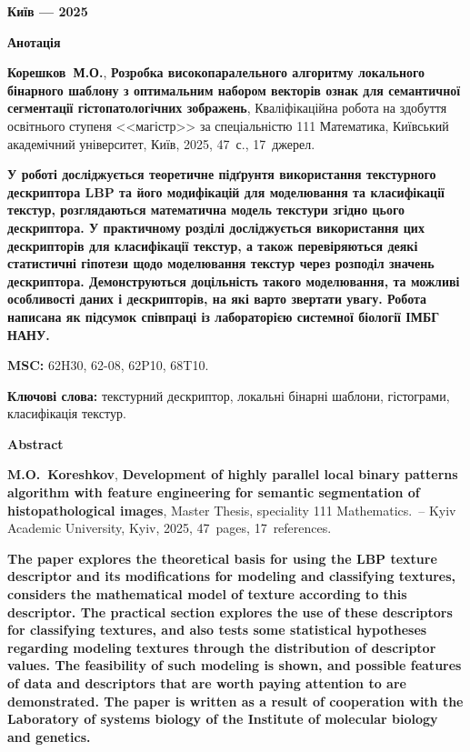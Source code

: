\documentclass{thesis}
\newcommand{\MyInitialName}{Корешков~М.О.}
\newcommand{\ThesisName}{Розробка високопаралельного алгоритму локального бінарного шаблону з оптимальним набором векторів ознак для семантичної сегментації гістопатологічних зображень}
\newcommand{\NumPages}{47}
\newcommand{\NumCitations}{17}
\newcommand{\MyReverseInitialNameEn}{M.O.~Koreshkov}
\newcommand{\ThesisNameEn}{Development of highly parallel local binary patterns algorithm with feature engineering for semantic segmentation of histopathological images}
\newcommand{\MSC}{62H30, 62-08, 62P10, 68T10.}
\newcommand{\1}{\mathbb 1}
\begin{document}
\vfill

\centerline{\bf Київ --- 2025}

\newpage

\begin{center}
\Large \bf Анотація
\end{center}

\noindent
\textbf{\MyInitialName}, \textbf{\ThesisName}, Кваліфікаційна робота на здобуття освітнього ступеня <<магістр>> за спеціальністю 111 Математика, Київський академічний університет, Київ, 2025, \NumPages~с., \NumCitations~джерел.

\bigskip


{\bf У роботі досліджується теоретичне підґрунтя використання текстурного дескриптора LBP та його модифікацій для моделювання та класифікації текстур, 
розглядаються математична модель текстури згідно цього дескриптора.
У практичному розділі досліджується використання цих дескрипторів для класифікації текстур, 
а також перевіряються деякі статистичні гіпотези щодо моделювання текстур через розподіл значень дескриптора.
Демонструються доцільність такого моделювання, та можливі особливості даних і дескрипторів, на які варто звертати увагу.
Робота написана як підсумок співпраці із лабораторією системної біології ІМБГ НАНУ.}

\bigskip

\noindent
{\bf MSC:} \MSC

\bigskip

\noindent
{\bf Ключові слова:} текстурний дескриптор, локальні бінарні шаблони, гістограми, класифікація текстур.
\bigskip

\newpage

\begin{center}
\Large \bf Abstract
\end{center}

\noindent
\textbf{\MyReverseInitialNameEn}, \textbf{\ThesisNameEn}, Master Thesis, speciality 111 Mathematics.~--
Kyiv Academic University, Kyiv, 2025, \NumPages~pages, \NumCitations~references.

\bigskip
{\bf The paper explores the theoretical basis for using the LBP texture descriptor and its modifications for modeling and classifying textures,
considers the mathematical model of texture according to this descriptor.
The practical section explores the use of these descriptors for classifying textures,
and also tests some statistical hypotheses regarding modeling textures through the distribution of descriptor values.
The feasibility of such modeling is shown, and possible features of data and descriptors that are worth paying attention to are demonstrated.
The paper is written as a result of cooperation with the Laboratory of systems biology of the Institute of molecular biology and genetics.}
\end{document}
